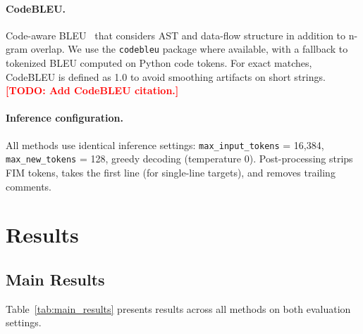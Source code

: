 \documentclass[11pt]{article}
\newcommand{\todo}[1]{\textcolor{red}{\textbf{[TODO: #1]}}}
\begin{document}
\paragraph{CodeBLEU.}
Code-aware BLEU~\cite{ren2020codebleu} that considers AST and data-flow structure in addition to n-gram overlap.
We use the \texttt{codebleu} package where available, with a fallback to tokenized BLEU computed on Python code tokens.
For exact matches, CodeBLEU is defined as 1.0 to avoid smoothing artifacts on short strings.
\todo{Add CodeBLEU citation.}

\paragraph{Inference configuration.}
All methods use identical inference settings: \texttt{max\_input\_tokens} = 16,384, \texttt{max\_new\_tokens} = 128, greedy decoding (temperature 0).
Post-processing strips FIM tokens, takes the first line (for single-line targets), and removes trailing comments.

\section{Results}
\label{sec:results}

\subsection{Main Results}

Table~\ref{tab:main_results} presents results across all methods on both evaluation settings.
\end{document}
